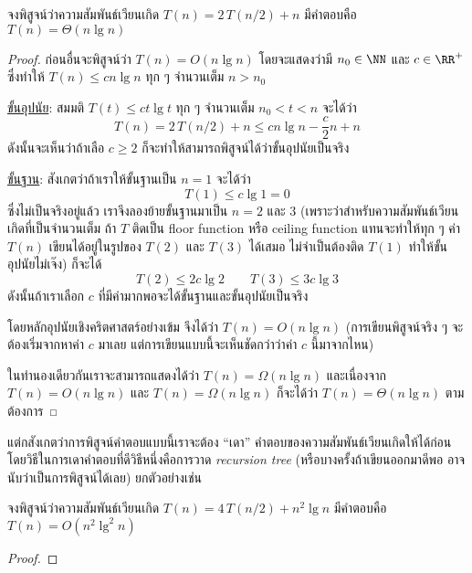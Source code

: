 \begin{exbox}
	จงพิสูจน์ว่าความสัมพันธ์เวียนเกิด $T(n) = 2\, T(n/2) + n$ มีคำตอบคือ $T(n) = \Theta(n\lg n)$
\end{exbox}
\begin{proof}
	ก่อนอื่นจะพิสูจน์ว่า $T(n) = O(n\lg n)$ โดยจะแสดงว่ามี $n_0 \in \NN$ และ $c \in \RR^+$ ซึ่งทำให้ $T(n) \leq cn\lg n$ ทุก ๆ จำนวนเต็ม $n > n_0$
	
	\underline{ขั้นอุปนัย}: สมมติ $T(t) \leq ct\lg t$ ทุก ๆ จำนวนเต็ม $n_0 < t < n$ จะได้ว่า
	\[
		T(n) = 2\,T(n/2) + n \leq cn\lg n - \frac{c}{2}n + n
	\]
	ดังนั้นจะเห็นว่าถ้าเลือ $c \geq 2$ ก็จะทำให้สามารถพิสูจน์ได้ว่าขั้นอุปนัยเป็นจริง
	
	\underline{ขั้นฐาน}: สังเกตว่าถ้าเราให้ขั้นฐานเป็น $n = 1$ จะได้ว่า
	\[
		T(1) \leq c\lg 1 = 0
	\]
	ซึ่งไม่เป็นจริงอยู่แล้ว เราจึงลองย้ายขั้นฐานมาเป็น $n = 2$ และ $3$ (เพราะว่าสำหรับความสัมพันธ์เวียนเกิดที่เป็นจำนวนเต็ม ถ้า $T$ ติดเป็น floor function หรือ ceiling function แทนจะทำให้ทุก ๆ ค่า $T(n)$ เขียนได้อยู่ในรูปของ $T(2)$ และ $T(3)$ ได้เสมอ ไม่จำเป็นต้องติด $T(1)$ ทำให้ขั้นอุปนัยไม่เจ๊ง) ก็จะได้
	\[
		T(2) \leq 2c\lg 2 \qquad T(3) \leq 3c\lg 3
	\]
	ดังนั้นถ้าเราเลือก $c$ ที่มีค่ามากพอจะได้ขั้นฐานและขั้นอุปนัยเป็นจริง
	
	โดยหลักอุปนัยเชิงคริตศาสตร์อย่างเข้ม จึงได้ว่า $T(n) = O(n\lg n)$ (การเขียนพิสูจน์จริง ๆ จะต้องเริ่มจากหาค่า $c$ มาเลย แต่การเขียนแบบนี้จะเห็นชัดกว่าว่าค่า $c$ นี้มาจากไหน)
	
	ในทำนองเดียวกันเราจะสามารถแสดงได้ว่า $T(n) = \Omega(n\lg n)$ และเนื่องจาก $T(n) = O(n\lg n)$ และ $T(n) = \Omega(n\lg n)$ ก็จะได้ว่า $T(n) = \Theta(n\lg n)$ ตามต้องการ
\end{proof}

แต่กสังเกตว่าการพิสูจน์คำตอบแบบนี้เราจะต้อง ``เดา'' คำตอบของความสัมพันธ์เวียนเกิดให้ได้ก่อน โดยวิธีในการเดาคำตอบที่ดีวิธีหนึ่งคือการวาด \emph{recursion tree} (หรือบางครั้งถ้าเขียนออกมาดีพอ อาจนับว่าเป็นการพิสูจน์ได้เลย) ยกตัวอย่างเช่น

\begin{exbox}
	จงพิสูจน์ว่าความสัมพันธ์เวียนเกิด $T(n) = 4\,T(n/2) + n^2\lg n$ มีคำตอบคือ $T(n) = O(n^2\lg^2 n)$
\end{exbox}
\begin{proof}
	
\end{proof}
